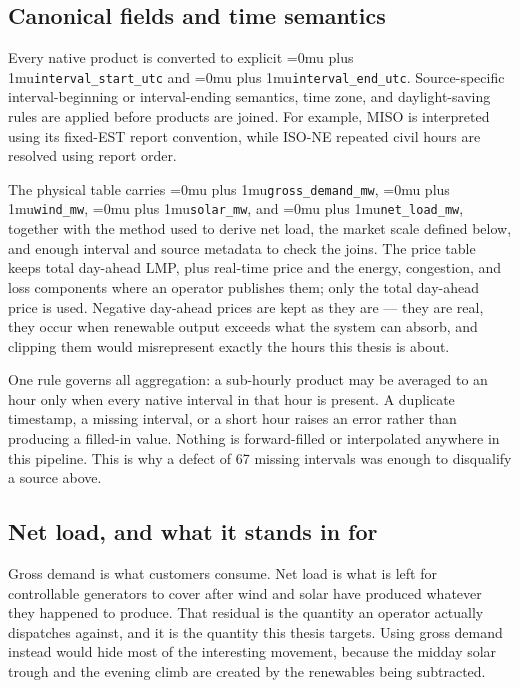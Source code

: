 ﻿\documentclass[12pt]{article}
\newcommand{\codepath}[1]{{\Urlmuskip=0mu plus 1mu\relax\nolinkurl{#1}}}
\begin{document}
\subsection{Canonical fields and time semantics}
\label{subsec:energy-canonical}

Every native product is converted to explicit
\codepath{interval_start_utc} and \codepath{interval_end_utc}. Source-specific
interval-beginning or interval-ending semantics, time zone, and daylight-saving
rules are applied before products are joined. For example, MISO is interpreted
using its fixed-EST report convention, while ISO-NE repeated civil hours are
resolved using report order.

The physical table carries \codepath{gross_demand_mw}, \codepath{wind_mw},
\codepath{solar_mw}, and \codepath{net_load_mw}, together with the method used
to derive net load, the market scale defined below, and enough interval and
source metadata to check the joins. The price table keeps total day-ahead LMP,
plus real-time price and the energy, congestion, and loss components where an
operator publishes them; only the total day-ahead price is used. Negative
day-ahead prices are kept as they are --- they are real, they occur when
renewable output exceeds what the system can absorb, and clipping them would
misrepresent exactly the hours this thesis is about.

One rule governs all aggregation: a sub-hourly product may be averaged to an
hour only when every native interval in that hour is present. A duplicate
timestamp, a missing interval, or a short hour raises an error rather than
producing a filled-in value. Nothing is forward-filled or interpolated
anywhere in this pipeline. This is why a defect of 67 missing intervals was
enough to disqualify a source above.

\subsection{Net load, and what it stands in for}
\label{subsec:energy-net-load}

Gross demand is what customers consume. Net load is what is left for
controllable generators to cover after wind and solar have produced whatever
they happened to produce. That residual is the quantity an operator actually
dispatches against, and it is the quantity this thesis targets. Using gross
demand instead would hide most of the interesting movement, because the midday
solar trough and the evening climb are created by the renewables being
subtracted.
\end{document}
